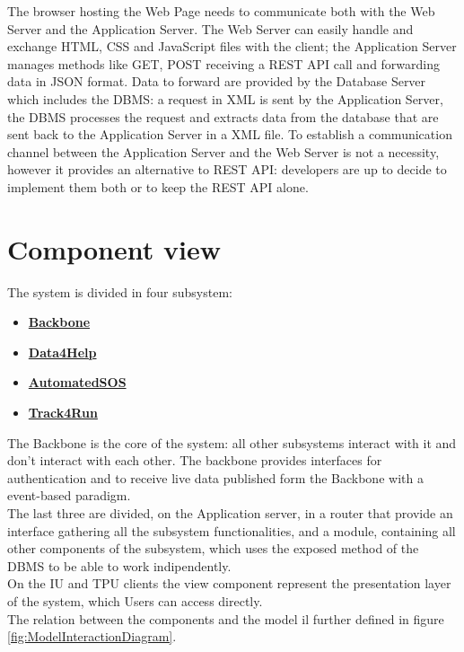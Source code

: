 The browser hosting the Web Page needs to communicate both with the Web Server and the Application Server. 
The Web Server can easily handle and exchange HTML, CSS and JavaScript files with the client; the Application Server manages methods like GET, POST receiving a REST API call and forwarding data in JSON format. Data to forward are provided by the Database Server which includes the DBMS: a request in XML is sent by the Application Server, the DBMS processes the request and extracts data from the database that are sent back to the Application Server in a XML file. To establish a communication channel between the Application Server and the Web Server is not a necessity, however it provides an alternative to REST API: developers are up to decide to implement them both or to keep the REST API alone. 

\section{Component view}
The system is divided in four subsystem:
\begin{itemize}
\item \textbf{\href{subsect:backboneComponentView}{Backbone}}
\item \textbf{\href{subsect:D4HComponentView}{Data4Help}}
\item \textbf{\href{subsect:ASOSComponentView}{AutomatedSOS}}
\item \textbf{\href{subsect:T4RComponentView}{Track4Run}}
\end{itemize}
The Backbone is the core of the system: all other subsystems interact with it and don't interact with each other. The backbone provides interfaces for authentication and to receive live data published form the Backbone with a event-based paradigm.\\
The last three are divided, on the Application server, in a router that provide an interface gathering all the subsystem functionalities, and a module, containing all other components of the subsystem, which uses the exposed method of the DBMS to be able to work indipendently. \\
On the IU and TPU clients the view component represent the presentation layer of the system, which Users can access directly.\\
The relation between the components and the model il further defined in figure \ref{fig:ModelInteractionDiagram}.
